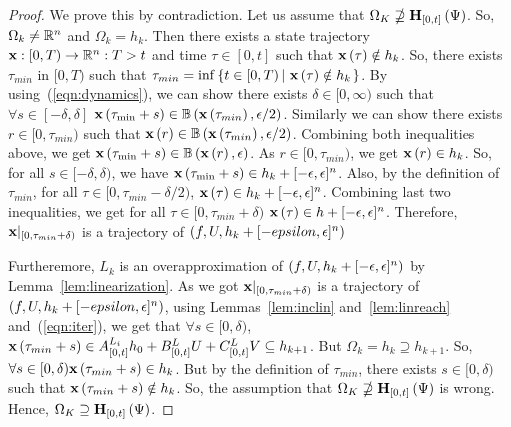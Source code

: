 \begin{proof}
We prove this by contradiction.  Let us assume that
$\Omega_K\nsupseteq \mathbf{H}_{[0,t]}\left(\Psi\right)$.  So,
$\Omega_k\neq\mathbb{R}^n$ and $\Omega_k = h_k$.  Then there exists a
state trajectory $\mathbf{x}:[0,T)\rightarrow\mathbb{R}^n:T>t$ and time
$\tau\in[0,t]$ such that $\mathbf{x}\left(\tau\right)\notin h_k$.  So, there exists
$\tau_{min}$ in $[0,T)$ such that $\tau_{min}
= \inf\left\{t\in[0,T)\left|~\mathbf{x}\left(\tau\right)\notin h_k\right.\right\}$.  By
using~(\ref{eqn:dynamics}), we can show there exists
$\delta\in[0,\infty)$ such that $\forall s\in[-\delta,\delta]$
$\mathbf{x}\left(\tau_{\min}+s\right)\in \mathbb{B}\left(\mathbf{x}\left(\tau_{min}\right),\epsilon/2\right)$.
Similarly we can show there exists $r\in[0,\tau_{min})$ such that
$\mathbf{x}\left(r\right)\in \mathbb{B}\left(\mathbf{x}\left(\tau_{min}\right),\epsilon/2\right)$.  Combining both
inequalities above, we get
$\mathbf{x}\left(\tau_{\min}+s\right)\in \mathbb{B}\left(\mathbf{x}\left(r\right),\epsilon\right)$.  As
$r\in[0,\tau_{min})$, we get $\mathbf{x}\left(r\right)\in h_k$.  So, for all
$s\in[-\delta,\delta)$, we have $\mathbf{x}\left(\tau_{\min}+s\right)\in h_k +
[-\epsilon,\epsilon]^n$.  Also, by the definition of $\tau_{min}$, for
all $\tau\in[0,\tau_{min}-\delta/2)$, $\mathbf{x}\left(\tau\right)\in h_k +
[-\epsilon,\epsilon]^n$. Combining last two inequalities, we get for
all $\tau\in[0,\tau_{min}+\delta)$ $\mathbf{x}\left(\tau\right)\in h +
[-\epsilon,\epsilon]^n$.  Therefore,
$\mathbf{x}|_{[0,\tau_{min}+\delta)}$ is a trajectory of
$\left(f,U,h_k+[-epsilon,\epsilon]^n\right)$

Furtheremore, $L_k$ is an overapproximation of
$\left(f,U,h_k+[-\epsilon,\epsilon]^n\right)$ by
Lemma~\ref{lem:linearization}.  As we got
$\mathbf{x}|_{[0,\tau_{min}+\delta)}$ is a trajectory of
$\left(f,U,h_k+[-epsilon,\epsilon]^n\right)$, using
Lemmas~\ref{lem:inclin} and~\ref{lem:linreach} and~(\ref{eqn:iter}),
we get that $\forall s\in [0,\delta)$,
$\mathbf{x}\left(\tau_{min}+s\right)\in {A}^{L_i}_{[0,t]}h_0
+ {B}^{L}_{[0,t]}U
+ {C}^{L}_{[0,t]}V \subseteq h_{k+1}$.  But
$\Omega_k=h_k\supseteq h_{k+1}$.  So, $\forall s\in
[0,\delta)\mathbf{x}\left(\tau_{min}+s\right)\in h_k$.  But by the definition of
$\tau_{min}$, there exists $s\in[0,\delta)$ such that
$\mathbf{x}\left(\tau_{min}+s\right)\notin h_k$.  So, the assumption that
$\Omega_K\nsupseteq \mathbf{H}_{[0,t]}\left(\Psi\right)$ is wrong.  Hence,
$\Omega_K\supseteq \mathbf{H}_{[0,t]}\left(\Psi\right)$.
\end{proof}
%

